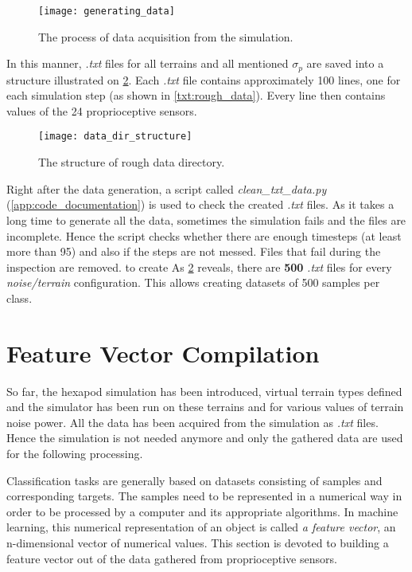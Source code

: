 \begin{figure}[H]
  \centering
  \texttt{[image: generating\_data]}
  \caption{The process of data acquisition from the simulation.}
  \label{img:generating_data}
\end{figure}

In this manner, \textit{.txt} files for all terrains and all mentioned $ \sigma_p $ are saved into a structure illustrated on \cref{img:data_dir_structure}. Each \textit{.txt} file contains approximately 100 lines, one for each simulation step (as shown in \cref{txt:rough_data}). Every line then contains values of the 24 proprioceptive sensors.

\begin{figure}[H]
  \centering
  \texttt{[image: data\_dir\_structure]}
  \caption{The structure of rough data directory.}
  \label{img:data_dir_structure}
\end{figure}

Right after the data generation, a script called \textit{clean\_txt\_data.py} (\ref{app:code_documentation}) is used to check the created \textit{.txt} files. As it takes a long time to generate all the data, sometimes the simulation fails and the files are incomplete. Hence the script checks whether there are enough timesteps (at least more than 95) and also if the steps are not messed. Files that fail during the inspection are removed.
to create
As \cref{img:data_dir_structure} reveals, there are \textbf{500} \textit{.txt} files for every \textit{noise/terrain} configuration. This allows creating datasets of 500 samples per class.

\section{Feature Vector Compilation} \label{sec:feature_vector_compilation}
So far, the hexapod simulation has been introduced, virtual terrain types defined and the simulator has been run on these terrains and for various values of terrain noise power. All the data has been acquired from the simulation as \textit{.txt} files. Hence the simulation is not needed anymore and only the gathered data are used for the following processing.

Classification tasks are generally based on datasets consisting of samples and corresponding targets. The samples need to be represented in a numerical way in order to be processed by a computer and its appropriate algorithms. In machine learning, this numerical representation of an object is called \textit{a feature vector}, an n-dimensional vector of numerical values. This section is devoted to building a feature vector out of the data gathered from proprioceptive sensors.

